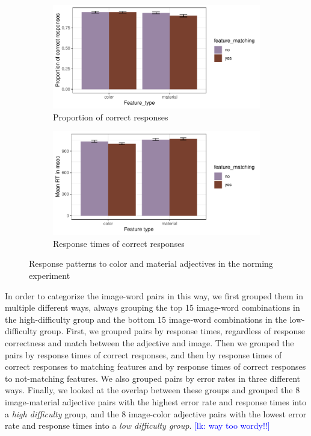 \documentclass[12pt,letterpaper]{article}
\newcommand{\lk}[1]{\textcolor{Blue}{[lk: #1]}}
\begin{document}
\begin{figure}[ht]
\centering
\begin{subfigure}{.4\textwidth}
\centering
\includegraphics[width=\textwidth]{plots/exp1_proportion.png}
\caption{Proportion of correct responses}
 \label{fig:exp1_a}
   \end{subfigure} \hspace{9mm}
   \begin{subfigure}{.4 \textwidth}
   \centering
   \includegraphics[width=\textwidth]{plots/exp1_rt.png}
   \caption{Response times of correct responses}
   \label{fig:exp1_b}
   \end{subfigure}
   \caption{Response patterns to color and material adjectives in the norming experiment}
   \label{fig:exp1}
\end{figure}   

In order to categorize the image-word pairs in this way, we first grouped them in multiple different ways, always grouping the top 15 image-word combinations in the high-difficulty group and the bottom 15 image-word combinations in the low-difficulty group. First, we grouped pairs by response times, regardless of response correctness and match between the adjective and image. Then we grouped the pairs by response times of correct responses, and then by response times of correct responses to matching features and by response times of correct responses to not-matching features. We also grouped pairs by error rates in three different ways. Finally, we looked at the overlap between these groups and grouped the 8 image-material adjective pairs with the highest error rate and response times into a \textit{high difficulty} group, and the 8 image-color adjective pairs with the lowest error rate and response times into a \textit{low difficulty group}. \lk {way too wordy!!}
\end{document}
